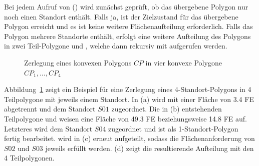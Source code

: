 \documentclass[ngerman]{seminarbeitrag}
\begin{document}
Bei jedem Aufruf von \con(\cp) wird zunächst geprüft, ob das übergebene Polygon nur noch einen Standort enthält. Falls ja, ist der Zielzustand für das
übergebene Polygon erreicht und es ist keine weitere Flächenaufteilung erforderlich. Falls das Polygon mehrere Standorte enthält, erfolgt eine weitere Aufteilung
des Polygons in zwei Teil-Polygone \prl und \pll, welche dann rekursiv mit \con aufgerufen werden.\\

\begin{figure}[h]
    \centering
    \caption{Zerlegung eines konvexen Polygons $CP$ in vier konvexe Polygone $CP_{1},...,CP_{4}$}
    \label{erstes beispiel}
\end{figure}

Abbildung~\ref{erstes beispiel} zeigt ein Beispiel für eine Zerlegung eines 4-Standort-Polygons in 4 Teilpolygone mit jeweils einem Standort. In (a) wird \prl mit einer Fläche von 3.4 FE abgetrennt und dem Standort $S01$ zugeordnet. Die in (b) entstehenden Teilpolygone \prl und \pll weisen eine Fläche von 49.3 FE beziehungsweise 14.8 FE auf. Letzteres wird dem Standort $S04$ zugeordnet und ist als 1-Standort-Polygon fertig bearbeitet. \prl wird in (c) erneut aufgeteilt, sodass die Flächenanforderung von $S02$ und $S03$ jeweils erfüllt werden. (d) zeigt die resultierende Aufteilung mit den 4 Teilpolygonen.  
\end{document}
